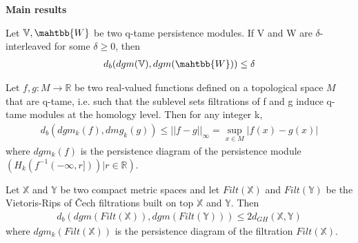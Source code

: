 \textbf{Main results}
\begin{theorem}
Let $\mathbb{V},\mahtbb{W}$ be two q-tame persistence modules. If V and W are $\delta$-interleaved for some $\delta \geq 0$, then
\begin{align*}
    d_b(dgm(\mathbb{V}), dgm(\mahtbb{W})) \leq \delta
\end{align*}
\end{theorem}

\begin{theorem}
Let $f,g : M \rightarrow \mathbb{R}$ be two real-valued functions defined on a topological space $M$ that are q-tame, i.e. such that the sublevel sets filtrations of f and g induce q-tame modules at the homology level. Then for any integer k,
\begin{align*}
    d_b(dgm_k(f), dmg_k(g)) \leq ||f-g||_\infty = \sup_{x \in M} |f(x) - g(x)|
\end{align*}
where $dgm_k(f)$ is the persistence diagram of the persistence module $(H_k(f^{-1}(-\infty,r])) | r\in \mathbb{R})$.
\end{theorem}
\begin{theorem}
Let $\mathbb{X}$ and $\mathbb{Y}$ be two compact metric spaces and let $Filt(\mathbb{X})$ and $Filt(\mathbb{Y})$ be the Vietoris-Rips of Čech filtrations built on top $\mathbb{X}$ and $\mathbb{Y}$. Then
\begin{align*}
    d_b(dgm(Filt(\mathbb{X})),dgm(Filt(\mathbb{Y}))) \leq 2 d_{GH}(\mathbb{X,Y})
\end{align*}
where $dgm_k(Filt(\mathbb{X}))$ is the persistence diagram of the filtration $Filt(\mathbb{X})$.
\end{theorem}
